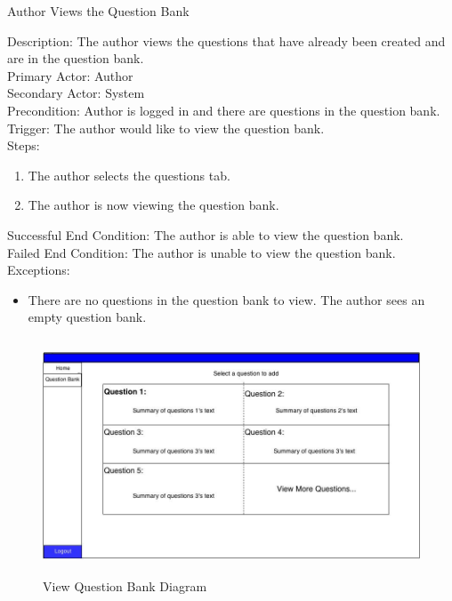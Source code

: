     \begin{section}{Author Views the Question Bank}
    
Description: The author views the questions that have already been created and are in the question bank.\\
Primary Actor: Author\\
Secondary Actor: System \\
Precondition: Author is logged in and there are questions in the question bank.\\
Trigger: The author would like to view the question bank.\\
Steps:
\begin{enumerate}
\item The author selects the questions tab.
\item The author is now viewing the question bank.

\end{enumerate}

Successful End Condition: The author is able to view the question bank.\\
Failed End Condition: The author is unable to view the question bank.\\
Exceptions:
\begin{itemize}
\item There are no questions in the question bank to view. The author sees an empty question bank.
\end{itemize}
    \begin{figure}[H]
            \centerline{\includegraphics[height=7cm]{View_Question_Bank.jpg}}
            \caption{View Question Bank Diagram}
    \end{figure}
    \end{section}
    
    
    
